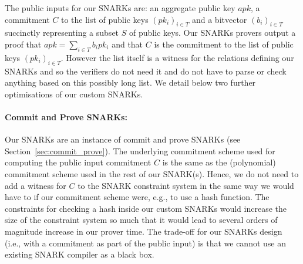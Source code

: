 \vspace{-0.05cm}
\noindent The public inputs for our SNARKs are: an aggregate public key $\mathit{apk}$, a commitment $C$ to the list of
public keys $(pk_i)_{i \in T}$ and a bitvector $(b_i)_{i \in T}$ succinctly representing a subset $S$ of public keys.
Our SNARKs provers output a proof that $apk=\sum_{i \in T} b_i pk_i$ and that $C$ is the commitment to the list of public keys
$(pk_i)_{i \in T}$. However the list itself is a witness for the relations defining our SNARKs and so the verifiers do not need it
and do not have to parse or check anything based on this possibly long list.
We detail below two further optimisations of our custom SNARKs.

\vspace{-0.05in}
\paragraph{Commit and Prove SNARKs:} Our SNARKs are an instance of commit and prove SNARKs (see Section~\ref{sec:commit_prove}).
The underlying commitment scheme used for computing the public input commitment $C$ is the same as the (polynomial) commitment scheme used in the rest of our SNARK(s). Hence, we do not need to add a witness for $C$
to the SNARK constraint system in the same way we would have to if our commitment scheme were, e.g., to use a hash function.
The constraints for checking a hash inside our custom SNARKs would increase the size of the constraint system so much that it would lead to several orders of magnitude increase in our prover time.
The trade-off for our SNARKs design (i.e., with a commitment as part of the public input) is that we cannot use an existing SNARK compiler as a black box.

